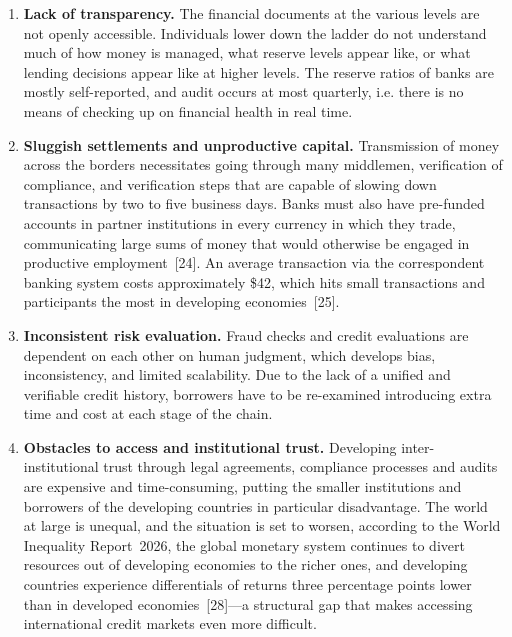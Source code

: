 \documentclass[12pt,a4paper]{report}
\begin{document}
\begin{enumerate}[noitemsep]
\item \textbf{Lack of transparency.} The financial documents at the various levels are not openly accessible. Individuals lower down the ladder do not understand much of how money is managed, what reserve levels appear like, or what lending decisions appear like at higher levels. The reserve ratios of banks are mostly self-reported, and audit occurs at most quarterly, i.e. there is no means of checking up on financial health in real time.

\item \textbf{Sluggish settlements and unproductive capital.} Transmission of money across the borders necessitates going through many middlemen, verification of compliance, and verification steps that are capable of slowing down transactions by two to five business days. Banks must also have pre-funded accounts in partner institutions in every currency in which they trade, communicating large sums of money that would otherwise be engaged in productive employment~[24]. An average transaction via the correspondent banking system costs approximately \$42, which hits small transactions and participants the most in developing economies~[25].

\item \textbf{Inconsistent risk evaluation.} Fraud checks and credit evaluations are dependent on each other on human judgment, which develops bias, inconsistency, and limited scalability. Due to the lack of a unified and verifiable credit history, borrowers have to be re-examined introducing extra time and cost at each stage of the chain.

\item \textbf{Obstacles to access and institutional trust.} Developing inter-institutional trust through legal agreements, compliance processes and audits are expensive and time-consuming, putting the smaller institutions and borrowers of the developing countries in particular disadvantage. The world at large is unequal, and the situation is set to worsen, according to the World Inequality Report~2026, the global monetary system continues to divert resources out of developing economies to the richer ones, and developing countries experience differentials of returns three percentage points lower than in developed economies~[28]---a structural gap that makes accessing international credit markets even more difficult.
\end{enumerate}
\end{document}
